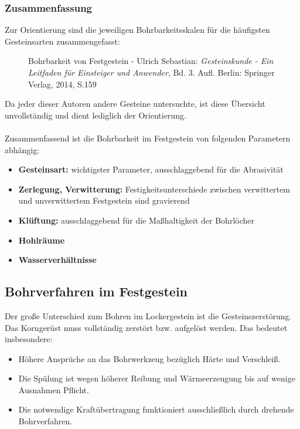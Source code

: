 \documentclass[12pt,a4paper,draft]{scrartcl} %
\begin{document}
\subsubsection{Zusammenfassung}

Zur Orientierung sind die jeweiligen Bohrbarkeitsskalen für die häufigsten Gesteinsarten zusammengefasst: 

\begin{figure}[H]
\caption{Bohrbarkeit von Festgestein - Ulrich Sebastian: \emph{Gesteinskunde - Ein Leitfaden für Einsteiger und Anwender}, Bd. 3. Aufl. Berlin: Springer Verlag, 2014, S.159}
\label{fig: Bohrbarkeit_Festgestein}
\end{figure}

Da jeder dieser Autoren andere Gesteine untersuchte, ist diese Übersicht unvollständig und dient lediglich der Orientierung.\\\\

Zusammenfassend ist die Bohrbarkeit im Festgestein von folgenden Parametern abhängig:

\begin{itemize}
\item \textbf{Gesteinsart:} wichtigster Parameter, ausschlaggebend für die Abrasivität
\item \textbf{Zerlegung, Verwitterung:} Festigkeitsunterschiede zwischen verwittertem und unverwittertem Festgestein sind gravierend
\item \textbf{Klüftung:} ausschlaggebend für die Maßhaltigkeit der Bohrlöcher
\item \textbf{Hohlräume}
\item \textbf{Wasserverhältnisse}
\end{itemize}



\subsection{Bohrverfahren im Festgestein}
\label{subsec:fest-verfahren}
Der große Unterschied zum Bohren im Lockergestein ist die Gesteinszerstörung. Das Korngerüst muss vollständig zerstört bzw. aufgelöst werden. Das bedeutet insbesondere:

\begin{itemize}
\item Höhere Ansprüche an das Bohrwerkzeug bezüglich Härte und Verschleiß.
\item Die Spülung ist wegen höherer Reibung und Wärmeerzeugung bis auf wenige Ausnahmen Pflicht.
\item Die notwendige Kraftübertragung funktioniert ausschließlich durch drehende Bohrverfahren.
\end{itemize}
\end{document}

